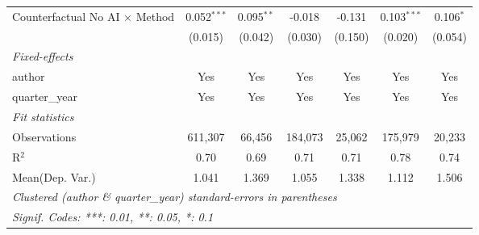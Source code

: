 \begin{tabular}{lcccccc}
   Counterfactual No AI $\times$ Method  & 0.052$^{***}$  & 0.095$^{**}$  & -0.018         & -0.131        & 0.103$^{***}$  & 0.106$^{*}$\\   
                                         & (0.015)        & (0.042)       & (0.030)        & (0.150)       & (0.020)        & (0.054)\\   
   \midrule
   \emph{Fixed-effects}\\
   author                                & Yes            & Yes           & Yes            & Yes           & Yes            & Yes\\  
   quarter\_year                         & Yes            & Yes           & Yes            & Yes           & Yes            & Yes\\  
   \midrule
   \emph{Fit statistics}\\
   Observations                          & 611,307        & 66,456        & 184,073        & 25,062        & 175,979        & 20,233\\  
   R$^2$                                 & 0.70           & 0.69          & 0.71           & 0.71          & 0.78           & 0.74\\  
Mean(Dep. Var.) & 1.041 & 1.369 & 1.055 & 1.338 & 1.112 & 1.506 \\
   \midrule \midrule
   \multicolumn{7}{l}{\emph{Clustered (author \& quarter\_year) standard-errors in parentheses}}\\
   \multicolumn{7}{l}{\emph{Signif. Codes: ***: 0.01, **: 0.05, *: 0.1}}\\
\end{tabular}
\par\endgroup

